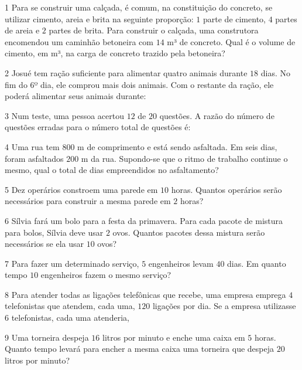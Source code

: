 {

\num{1}  Para se construir uma calçada, é comum, na constituição do concreto,
se utilizar cimento, areia e brita na seguinte proporção: $1$ parte de
cimento, $4$ partes de areia e $2$ partes de brita. Para construir o
calçada, uma construtora encomendou um caminhão betoneira com $14$ m³ de
concreto. Qual é o volume de cimento, em m³, na carga de concreto
trazido pela betoneira?


\num{2}  Josué tem ração suficiente para alimentar quatro animais durante $18$
dias. No fim do $6$º dia, ele comprou mais dois animais. Com o restante da
ração, ele poderá alimentar seus animais durante:


\num{3}  Num teste, uma pessoa acertou $12$ de $20$ questões. A razão do número de
questões erradas para o número total de questões é:


\num{4}  Uma rua tem $800$ m de comprimento e está sendo asfaltada. Em seis
dias, foram asfaltados $200$ m da rua. Supondo-se que o ritmo de trabalho
continue o mesmo, qual o total de dias empreendidos no asfaltamento?


\num{5}  Dez operários constroem uma parede em $10$ horas. Quantos operários
serão necessários para construir a mesma parede em $2$ horas?


\num{6}  Sílvia fará um bolo para a festa da primavera. Para cada pacote de
mistura para bolos, Sílvia deve usar $2$ ovos. Quantos pacotes dessa
mistura serão necessários se ela usar $10$ ovos?


\num{7}  Para fazer um determinado serviço, $5$ engenheiros levam $40$ dias. Em
quanto tempo $10$ engenheiros fazem o mesmo serviço?


\num{8}  Para atender todas as ligações telefônicas que recebe, uma empresa
emprega $4$ telefonistas que atendem, cada uma, $120$ ligações por dia. Se a
empresa utilizasse $6$ telefonistas, cada uma atenderia,


\num{9}  Uma torneira despeja $16$ litros por minuto e enche uma caixa em $5$
horas. Quanto tempo levará para encher a mesma caixa uma torneira que
despeja $20$ litros por minuto?

}
